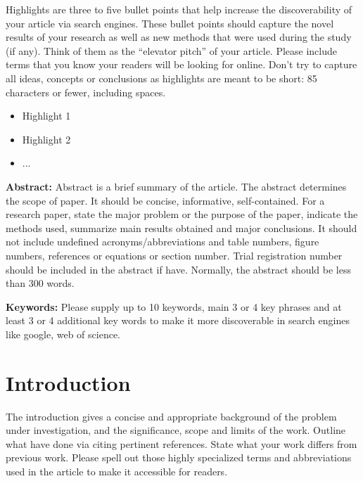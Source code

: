 \documentclass{ELSP}
\begin{document}
\vspace{+12pt}
\noindent Highlights are three to five bullet points that help increase the discoverability of your article via search engines. These bullet points should capture the novel results of your research as well as new methods that were used during the study (if any). Think of them as the “elevator pitch” of your article. Please include terms that you know your readers will be looking for online. Don't try to capture all ideas, concepts or conclusions as highlights are meant to be short: 85 characters or fewer, including spaces.
\vspace{12pt}
\begin{itemize}[left=0pt, labelwidth=0pt, labelsep=17pt, itemsep=0pt]
    \item Highlight 1
    \item Highlight 2
    \item ...
\end{itemize}

\vspace{10pt}
\noindent\textbf{\textbf{\textcolor[RGB]{0,131,255}{Abstract:}}} Abstract is a brief summary of the article. The
abstract determines the scope of paper. It should be concise,
informative, self-contained. For a research paper, state the major
problem or the purpose of the paper, indicate the methods used,
summarize main results obtained and major conclusions. It should not
include undefined acronyms/abbreviations and table numbers, figure
numbers, references or equations or section number. Trial registration
number should be included in the abstract if have. Normally, the
abstract should be less than 300 words.

\vspace{+12pt}
\noindent\textbf{\textcolor[RGB]{0,131,255}{Keywords:}} Please supply up to 10 keywords, main 3 or 4 key phrases and at least 3 or 4 additional key words to make it more discoverable in search engines like google, web of science.


\section{Introduction}

The introduction gives a concise and appropriate background of the
problem under investigation, and the significance, scope and limits of
the work. Outline what have done via citing pertinent references. State what your work differs from previous work. Please spell out those highly specialized terms and abbreviations used in the article to make it
accessible for readers.
\end{document}
